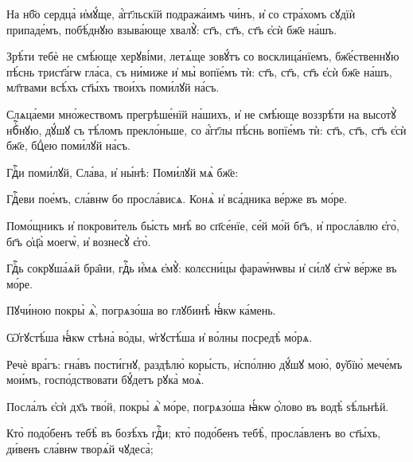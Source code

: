 \hKv На нб҃о сердца̀ и҆мꙋ́ще, а҆́гг҃льскїй подража́имъ чи́нъ, и҆  со стра́хомъ сꙋдїѝ припаде́мъ, побѣ́днꙋю взыва́юще хвалꙋ̀: ст҃ъ, ст҃ъ, ст҃ъ є҆сѝ бж҃е на́шъ.  
%

\hKv Зрѣ́ти тебѐ не смѣ́юще херꙋві́ми, летѧ́ще зовꙋ́тъ  со восклица́нїемъ, бж҃е́ственнꙋю пѣ́снь трист҃а́гѡ гла́са,  съ ни́миже и҆ мы̀ вопїе́мъ тѝ: ст҃ъ, ст҃ъ, ст҃ъ є҆сѝ бж҃е  на́шъ, мл҃твами всѣ́хъ ст҃ы́хъ твои́хъ поми́лꙋй на́съ. 
%

\hKv Слѧца́еми мно́жествомъ прегрѣше́нїй на́шихъ, и҆  не смѣ́юще воззрѣ́ти на высотꙋ̀ нбⷭ҇нꙋю, дꙋ́шꙋ съ тѣ́ломъ  прекло́ньше, со а҆́гг҃лы пѣ́снь вопїе́мъ тѝ: ст҃ъ, ст҃ъ,  ст҃ъ є҆сѝ бж҃е, бцⷣею поми́лꙋй на́съ. 

 Гдⷭ҇и поми́лꙋй,  Сла́ва, и҆  ны́нѣ: Поми́лꙋй мѧ̀ бж҃е:  
%

\hKv Гдⷭ҇еви пое́мъ, сла́внѡ бо просла́висѧ. Конѧ̀ и҆ вса́дника  ве́рже въ мо́ре. 
%

\hKv Помо́щникъ и҆ покрови́тель бы́сть мнѣ̀ во сп҃се́нїе, се́й  мо́й бг҃ъ, и҆ просла́влю є҆го̀, бг҃ъ ѻ҆ц҃а̀ моегѡ̀, и҆  вознесꙋ̀ є҆го̀. 
%

\hKv Гдⷭ҇ь сокрꙋша́ѧй бра̑ни, гдⷭ҇ь и҆́мѧ є҆мꙋ̀: колєсни́цы  фараѡ́нѡвы и҆ си́лꙋ є҆гѡ̀ ве́рже въ мо́ре. 
%

\hKv Пꙋчи́ною покры̀ ѧ҆̀, погрѧзо́ша во глꙋбинѣ̀ ꙗ҆́кѡ ка́мень. 


\hKv Ѡ҆гꙋстѣ́ша ꙗ҆́кѡ стѣна̀ во́ды, ѡ҆гꙋстѣ́ша и҆ во́лны  посредѣ̀ мо́рѧ. 
%

\hKv Речѐ вра́гъ: гна́въ пости́гнꙋ, раздѣлю̀  коры́сть, и҆спо́лню дꙋ́шꙋ мою̀, ᲂу҆бїю̀ мече́мъ  мои́мъ, госпо́дствовати бꙋ́детъ рꙋка̀ моѧ̀. 
%

\hKv Посла́лъ є҆сѝ дх҃ъ тво́й, покры̀ ѧ҆̀ мо́ре, погрѧзо́ша  ꙗ҆́кѡ ѻ҆́лово въ водѣ̀ ѕѣ́льнѣй. 

\hKv Кто̀ подо́бенъ тебѣ̀ въ бозѣ́хъ гдⷭ҇и; кто̀ подо́бенъ  тебѣ̀, просла́вленъ во ст҃ы́хъ, ди́венъ сла́внѡ творѧ́й  чꙋдеса̀; 

